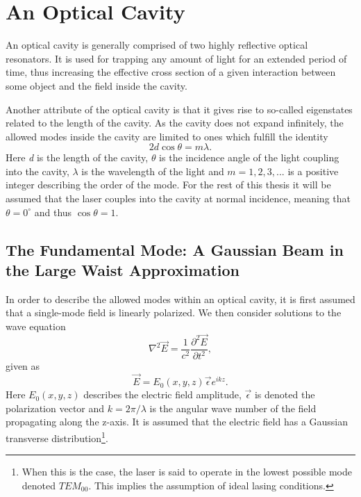\section{An Optical Cavity}

An optical cavity is generally comprised of two highly reflective optical resonators. It is used for trapping any amount of light for an extended period of time, thus increasing the effective cross section of a given interaction between some object and the field inside the cavity. 

Another attribute of the optical cavity is that it gives rise to so-called eigenstates related to the length of the cavity\cite{Eichhorn}. As the cavity does not expand infinitely, the allowed modes inside the cavity are limited to ones which fulfill the identity \cite{Pedrotti}
\begin{equation}
    2 d \cos \theta = m \lambda.
\end{equation}
Here \emph{d} is the length of the cavity, $\theta$ is the incidence angle of the light coupling into the cavity, $\lambda$ is the wavelength of the light and $m = 1,2,3,...$ is a positive integer describing the order of the mode. For the rest of this thesis it will be assumed that the laser couples into the cavity at normal incidence, meaning that $\theta = 0^{\circ}$ and thus $\cos \theta = 1$.

\subsection{The Fundamental Mode: A Gaussian Beam in the Large Waist Approximation}

In order to describe the allowed modes within an optical cavity, it is first assumed that a single-mode field is linearly polarized. We then consider solutions to the wave equation
\begin{equation}
    \nabla^2 \vec{E} = \frac{1}{c^2} \frac{\partial^2 \vec{E}}{\partial t^2},
\end{equation}
given as
\begin{equation}
    \vec{E} = E_0 (x,y,z) \vec{\epsilon} e^{i k z}. 
\end{equation}
Here $E_0(x,y,z)$ describes the electric field amplitude, $\vec{\epsilon}$ is denoted the polarization vector and $k=2 \pi / \lambda$ is the angular wave number of the field propagating along the z-axis. It is assumed that the electric field has a Gaussian transverse distribution\footnote{When this is the case, the laser is said to operate in the lowest possible mode denoted $TEM_{00}$. This implies the assumption of ideal lasing conditions.}.

